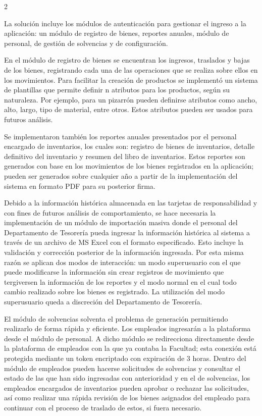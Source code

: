 \documentclass[12pt,spanish,Letterpaper,openany]{book}
\begin{document}
\begin {multicols}{2}

La solución incluye los módulos de autenticación para gestionar el ingreso a la aplicación: un módulo de registro de bienes, reportes anuales, módulo de personal, de gestión de solvencias y de configuración.

En el módulo de registro de bienes se encuentran los ingresos, traslados y bajas de los bienes, registrando cada una de las operaciones que se realiza sobre ellos en los movimientos. Para facilitar la creación de productos se implementó un sistema de plantillas que permite definir n atributos para los productos, según su naturaleza. Por ejemplo, para un pizarrón pueden definirse atributos como ancho, alto, largo, tipo de material, entre otros. Estos atributos pueden ser usados para futuros análisis.

Se implementaron también los reportes anuales presentados por el personal encargado de inventarios, los cuales son: registro de bienes de inventarios, detalle definitivo del inventario y resumen del libro de inventarios. Estos reportes son generados con base en los movimientos de los bienes registrados en la aplicación; pueden ser generados sobre cualquier año a partir de la implementación del sistema en formato PDF para su posterior firma.

Debido a la información histórica almacenada en las tarjetas de responsabilidad y con fines de futuros análisis de comportamiento, se hace necesaria la implementación de un módulo de importación masiva donde el personal del Departamento de Tesorería pueda ingresar la información histórica al sistema a través de un archivo de MS Excel con el formato especificado. Esto incluye la validación y corrección posterior de la información ingresada. Por esta misma razón se aplican dos modos de interacción: un modo superusuario con el que puede modificarse la información sin crear registros de movimiento que tergiversen la información de los reportes y el modo normal en el cual todo cambio realizado sobre los bienes es registrado. La utilización del modo superusuario queda a discreción del Departamento de Tesorería.

El módulo de solvencias solventa el problema de generación permitiendo realizarlo de forma rápida y eficiente. Los empleados ingresarán a la plataforma desde el módulo de personal. A dicho módulo se redirecciona directamente desde la plataforma de empleados con la que ya contaba la Facultad; esta conexión está protegida mediante un token encriptado con expiración de 3 horas. Dentro del módulo de empleados pueden hacerse solicitudes de solvencias y consultar el estado de las que han sido ingresadas con anterioridad y en el de solvencias, los empleados encargados de inventarios pueden aprobar o rechazar las solicitudes, así como realizar una rápida revisión de los bienes asignados del empleado para continuar con el proceso de traslado de estos, si fuera necesario.


\end{multicols}
\end{document}
